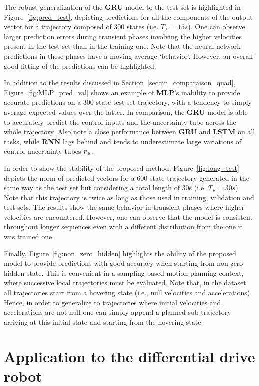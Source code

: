 The robust generalization of the \textbf{GRU} model to the test set is highlighted in Figure~\ref{fig:pred_test}, depicting predictions for all the components of the output vector for a trajectory composed of 300 states (i.e. $T_F=15s$).
One can observe larger prediction errors during transient phases involving the higher velocities present in the test set than in the training one.
Note that the neural network predictions in these phases have a moving average `behavior'. 
However, an overall good fitting of the predictions can be highlighted.

In addition to the results discussed in Section~\ref{sec:nn_comparaison_quad}, Figure~\ref{fig:MLP_pred_val} shows an example of \textbf{MLP}'s inability to provide accurate predictions on a 300-state test set trajectory, with a tendency to simply average expected values over the latter.
In comparison, the \textbf{GRU} model is able to accurately predict the control inputs and the uncertainty tube across the whole trajectory. 
Also note a close performance between \textbf{GRU} and \textbf{LSTM} on all tasks, while \textbf{RNN} lags behind and tends to underestimate large variations of control uncertainty tubes $\boldsymbol{r_u}$.

In order to show the stability of the proposed method, Figure~\ref{fig:long_test} depicts the norm of predicted vectors for a 600-state trajectory generated in the same way as the test set but considering a total length of 30s (i.e. $T_F=30s$).
Note that this trajectory is twice as long as those used in training, validation and test sets.
The results show the same behavior in transient phases where higher velocities are encountered.
However, one can observe that the model is consistent throughout longer sequences even with a different distribution from the one it was trained one. 

Finally, Figure~\ref{fig:non_zero_hidden} highlights the ability of the proposed model to provide predictions with good accuracy when starting from non-zero hidden state. 
This is convenient in a sampling-based motion planning context, where successive local trajectories must be evaluated.
Note that, in the dataset all trajectories start from a hovering state (i.e., null velocities and accelerations). 
Hence, in order to generalize to trajectories where initial velocities and accelerations are not null one can simply append a planned sub-trajectory arriving at this initial state and starting from the hovering state.

\section{Application to the differential drive robot} \label{sec:DDR_appli}


